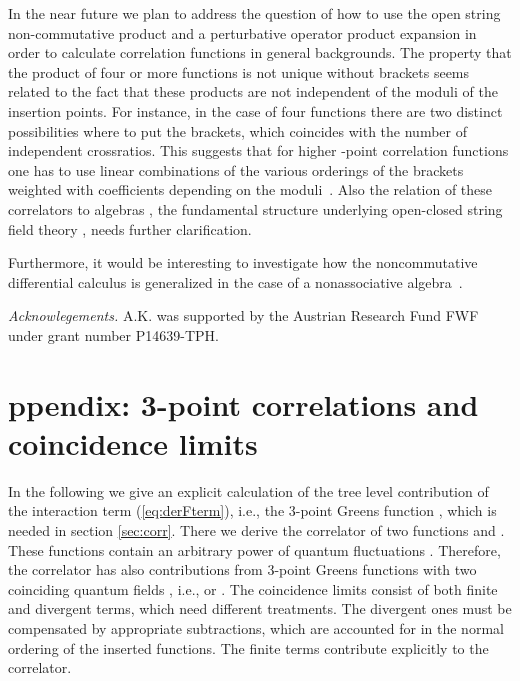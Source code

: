 \documentclass[a4paper,12pt]{article}
\let\bra=\langle        \let\ket=\rangle
\begin{document}
In the near future we plan to address the question of how to use the 
open string non-commutative product and a perturbative operator product 
expansion in order to calculate correlation functions in general backgrounds. 
The property that the product of four or more functions is not unique without 
brackets seems related to the fact that these products are not independent of 
the moduli of the insertion points. For instance, in the case of four 
functions there are two distinct possibilities where to put the brackets, 
which coincides with the number of independent crossratios. This suggests 
that for 
higher \coordHE{}-point correlation functions one has to use linear combinations 
of the various orderings of the brackets weighted with coefficients 
depending on the moduli~\cite{Ho:2001qk}. 
Also the relation of these correlators to \coordHE{} algebras \cite{stasheff}, 
the fundamental structure underlying
open-closed string field theory \cite{zwiebach}, needs further clarification.

Furthermore, it would be interesting to investigate how the 
noncommutative differential calculus is generalized in the case of a 
nonassociative algebra~\cite{Ho:2001fi}.

{\it Acknowlegements.}
A.K. was supported by the Austrian 
Research Fund FWF under grant number P14639-TPH.


\newpage

\appendix


\section{\hspace*{-20pt}ppendix: 3-point correlations and coincidence limits}
\label{sec:appx}

In the following we give an explicit calculation of the tree level 
contribution of the interaction term (\ref{eq:derFterm}), i.e., the
3-point Greens function 
\myHighlight{$\bra\!\zeta^\mu(\tau_i) \zeta^\nu(\tau_j) \zeta^\rho(\tau_k)\!\ket$}\coordHE{}, 
which is needed in section \ref{sec:corr}. 
There we derive the correlator of two
functions \coordHE{} and \coordHE{}. These functions contain an arbitrary power
of quantum fluctuations \myHighlight{$\zeta^\mu$}\coordHE{}. Therefore, the correlator
has also contributions from 3-point Greens functions with two
coinciding quantum fields \myHighlight{$\zeta^\mu$}\coordHE{}, i.e., 
\myHighlight{$\lim_{\tau_j\rightarrow\tau_i}\bra\zeta^\mu(\tau_i)\zeta^\nu(\tau_j)\zeta^\rho(\tau_k)\ket$}\coordHE{} or 
\myHighlight{$\lim_{\tau_j \rightarrow \tau_k}\bra\zeta^\mu(\tau_i) \zeta^\nu(\tau_j) \zeta^\rho(\tau_k)\ket$}\coordHE{}.
The coincidence limits consist of both finite and divergent terms,
which need different treatments. The divergent ones must be
compensated by appropriate subtractions, which are accounted for in
the normal ordering of the inserted functions. The finite terms
contribute explicitly to the correlator.
\end{document}
